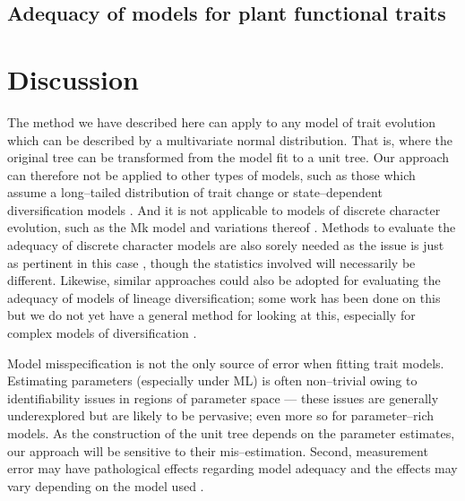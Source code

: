 \documentclass[12pt]{article}
\begin{document}
\subsection*{Adequacy of models for plant functional traits}

\section*{Discussion}

The method we have described here can apply to any model of trait evolution which can be described by a multivariate normal distribution. That is, where the original tree can be transformed from the model fit to a unit tree. Our approach can therefore not be applied to other types of models, such as those which assume a long--tailed distribution of trait change \citep[e.g.][]{Landis2012} or state--dependent diversification models \citep[e.g.][]{Bokma2008, Bokma2010, FitzJohn2010}. And it is not applicable to models of discrete character evolution, such as the Mk model \citep{Pagel1994, Lewis2001} and variations thereof \citep[e.g.][]{Maddison2007, WagnerMarcot2010, Mazeralli2012, Beaulieu2013} \citep[but see Felsenstein's threshold model;][]{Felsenstein2005, Felsenstein2012}. Methods to evaluate the adequacy of discrete character models are also sorely needed as the issue is just as pertinent in this case \citep{ReadNee1995, MaddisonFitzJohn}, though the statistics involved will necessarily be different. Likewise, similar approaches could also be adopted for evaluating the adequacy of models of lineage diversification; some work has been done on this \citep[e.g.][]{Rabosky2009AmNat, Rabosky2012, Hohna2013} but we do not yet have a general method for looking at this, especially for complex models of diversification \citep[e.g.][]{Stadler2011, Etienne2012}.

Model misspecification is not the only source of error when fitting trait models. Estimating parameters (especially under ML) is often non--trivial owing to identifiability issues in regions of parameter space \citep{HoAne2008, HoAne2012} --- these issues are generally underexplored but are likely to be pervasive; even more so for parameter--rich models. As the construction of the unit tree depends on the parameter estimates, our approach will be sensitive to their mis--estimation. Second, measurement error may have pathological effects regarding model adequacy \citep{HarmonLosos2005} and the effects may vary depending on the model used \citep{RevellReynolds2012, PennellPE}.
\end{document}
